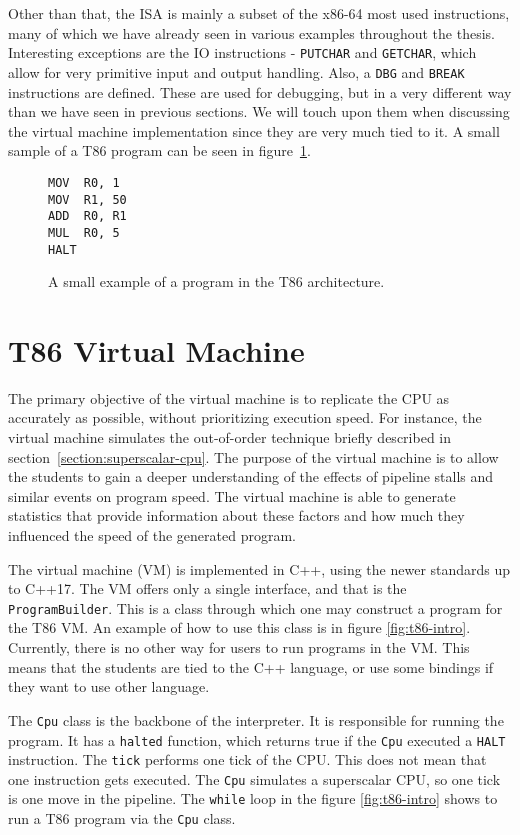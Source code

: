 Other than that, the ISA is mainly a subset of the x86-64 most used
instructions, many of which we have already seen in various examples throughout
the thesis. Interesting exceptions are the IO instructions - \texttt{PUTCHAR}
and \texttt{GETCHAR}, which allow for very primitive input and output handling.
Also, a \texttt{DBG} and \texttt{BREAK} instructions are defined. These are
used for debugging, but in a very different way than we have seen in previous
sections. We will touch upon them when discussing the virtual machine
implementation since they are very much tied to it. A small sample of a T86
program can be seen in figure~\ref{fig:t86-example}.

\begin{figure}
    \begin{lstlisting}
MOV  R0, 1
MOV  R1, 50
ADD  R0, R1
MUL  R0, 5
HALT
    \end{lstlisting}
    \caption{A small example of a program in the T86 architecture.}
    \label{fig:t86-example}
\end{figure}

\section{T86 Virtual Machine}\label{section:t86-vm}
The primary objective of the virtual machine is to replicate the CPU as
accurately as possible, without prioritizing execution speed. For instance, the
virtual machine simulates the out-of-order technique briefly described in
section~\ref{section:superscalar-cpu}. The purpose of the virtual machine is to
allow the students to gain a deeper understanding of the effects of pipeline
stalls and similar events on program speed. The virtual machine is able to
generate statistics that provide information about these factors and how
much they influenced the speed of the generated program.

The virtual machine (VM) is implemented in C++, using the newer standards up to
C++17. The VM offers only a single interface, and that is the
\texttt{ProgramBuilder}. This is a class through which one may construct a
program for the T86 VM. An example of how to use this class is in figure
\ref{fig:t86-intro}. Currently, there is no other way for users to run programs
in the VM. This means that the students are tied to the C++ language, or use
some bindings if they want to use other language.

The \texttt{Cpu} class is the backbone of the interpreter. It is responsible
for running the program. It has a \texttt{halted} function, which returns true
if the \texttt{Cpu} executed a \texttt{HALT} instruction. The \texttt{tick}
performs one tick of the CPU. This does not mean that one instruction gets
executed. The \texttt{Cpu} simulates a superscalar CPU, so one tick is one move
in the pipeline. The \texttt{while} loop in the figure \ref{fig:t86-intro}
shows to run a T86 program via the \texttt{Cpu} class.

